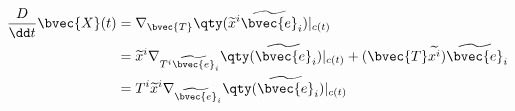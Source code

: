 \begin{equation}
\begin{aligned}
\frac{D}{\dd t}\bvec{X}(t)&=\nabla_\bvec{T}\qty(\widetilde{x}^i\widetilde{\bvec{e}}_i)|_{c(t)}\\
&=\widetilde{x}^i\nabla_{T^i\widetilde{\bvec{e}}_i}\qty(\widetilde{\bvec{e}}_i)|_{c(t)}+(\bvec{T}\widetilde{x^i})\widetilde{\bvec{e}}_i\\
&=T^i\widetilde{x}^i\nabla_{\widetilde{\bvec{e}}_i}\qty(\widetilde{\bvec{e}}_i)|_{c(t)}\\
\end{aligned}
\end{equation}















